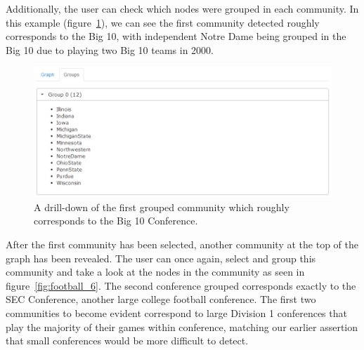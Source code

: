 \documentclass{article}\usepackage[]{graphicx}\usepackage[]{color}
\begin{document}
Additionally, the user can check which nodes were grouped in each community. In this example (figure~\ref{fig:football_5}), we can see the first community detected roughly corresponds to the Big 10, with independent Notre Dame being grouped in the Big 10 due to playing two Big 10 teams in 2000.

\begin{figure}[H]
\centering
\includegraphics[width=\textwidth]{images/football_5.png}
\caption{\label{fig:football_5} A drill-down of the first grouped community which roughly corresponds to the Big 10 Conference.}
\end{figure}

After the first community has been selected, another community at the top of the graph has been revealed. The user can once again, select and group this community and take a look at the nodes in the community as seen in figure~\ref{fig:football_6}. The second conference grouped corresponds exactly to the SEC Conference, another large college football conference. The first two communities to become evident correspond to large Division 1 conferences that play the majority of their games within conference, matching our earlier assertion that small conferences would be more difficult to detect.
\end{document}
